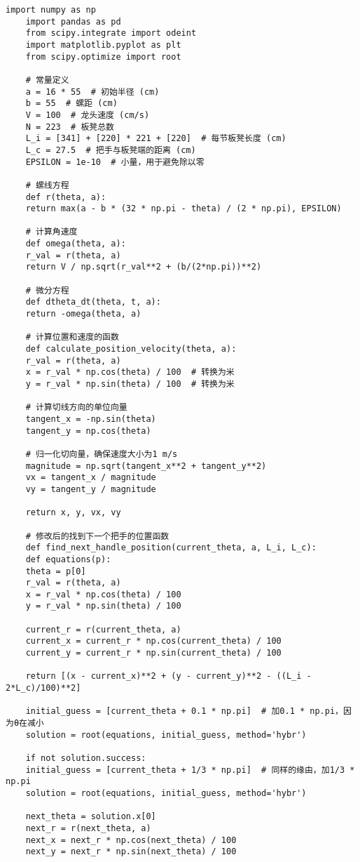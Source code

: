 \begin{lstlisting}[caption={问题一处理代码1}]
	import numpy as np
	import pandas as pd
	from scipy.integrate import odeint
	import matplotlib.pyplot as plt
	from scipy.optimize import root
	
	# 常量定义
	a = 16 * 55  # 初始半径 (cm)
	b = 55  # 螺距 (cm)
	V = 100  # 龙头速度 (cm/s)
	N = 223  # 板凳总数
	L_i = [341] + [220] * 221 + [220]  # 每节板凳长度 (cm)
	L_c = 27.5  # 把手与板凳端的距离 (cm)
	EPSILON = 1e-10  # 小量，用于避免除以零
	
	# 螺线方程
	def r(theta, a):
	return max(a - b * (32 * np.pi - theta) / (2 * np.pi), EPSILON)
	
	# 计算角速度
	def omega(theta, a):
	r_val = r(theta, a)
	return V / np.sqrt(r_val**2 + (b/(2*np.pi))**2)
	
	# 微分方程
	def dtheta_dt(theta, t, a):
	return -omega(theta, a)
	
	# 计算位置和速度的函数
	def calculate_position_velocity(theta, a):
	r_val = r(theta, a)
	x = r_val * np.cos(theta) / 100  # 转换为米
	y = r_val * np.sin(theta) / 100  # 转换为米
	
	# 计算切线方向的单位向量
	tangent_x = -np.sin(theta)
	tangent_y = np.cos(theta)
	
	# 归一化切向量，确保速度大小为1 m/s
	magnitude = np.sqrt(tangent_x**2 + tangent_y**2)
	vx = tangent_x / magnitude
	vy = tangent_y / magnitude
	
	return x, y, vx, vy
	
	# 修改后的找到下一个把手的位置函数
	def find_next_handle_position(current_theta, a, L_i, L_c):
	def equations(p):
	theta = p[0]
	r_val = r(theta, a)
	x = r_val * np.cos(theta) / 100
	y = r_val * np.sin(theta) / 100
	
	current_r = r(current_theta, a)
	current_x = current_r * np.cos(current_theta) / 100
	current_y = current_r * np.sin(current_theta) / 100
	
	return [(x - current_x)**2 + (y - current_y)**2 - ((L_i - 2*L_c)/100)**2]
	
	initial_guess = [current_theta + 0.1 * np.pi]  # 加0.1 * np.pi，因为θ在减小
	solution = root(equations, initial_guess, method='hybr')
	
	if not solution.success:
	initial_guess = [current_theta + 1/3 * np.pi]  # 同样的缘由，加1/3 * np.pi
	solution = root(equations, initial_guess, method='hybr')
	
	next_theta = solution.x[0]
	next_r = r(next_theta, a)
	next_x = next_r * np.cos(next_theta) / 100
	next_y = next_r * np.sin(next_theta) / 100
	

\end{lstlisting}
